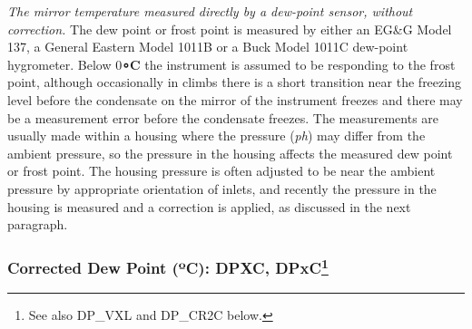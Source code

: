 \documentclass[
]{book}
\begin{document}
\emph{The mirror temperature measured directly by a dew-point sensor, without correction.} The dew point or frost point is measured by either an EG\&G Model 137, a General Eastern Model 1011B or a Buck Model 1011C dew-point hygrometer. Below 0\textbf{{∘}C} the instrument is assumed to be responding to the frost point, although occasionally in climbs there is a short transition near the freezing level before the condensate on the mirror of the instrument freezes and there may be a measurement error before the condensate freezes. The measurements are usually made within a housing where the pressure ({\emph{p}\emph{h})} may differ from the ambient pressure, so the pressure in the housing affects the measured dew point or frost point. The housing pressure is often adjusted to be near the ambient pressure by appropriate orientation of inlets, and recently the pressure in the housing is measured and a correction is applied, as discussed in the next paragraph.

\hypertarget{dewpt-corrected}{%
\subsubsection*{\texorpdfstring{Corrected Dew Point ({º}C): DPXC, DPxC\footnote{See also DP\_VXL and DP\_CR2C below.}}{Corrected Dew Point (ºC): DPXC, DPxC}}\label{dewpt-corrected}}
\end{document}
